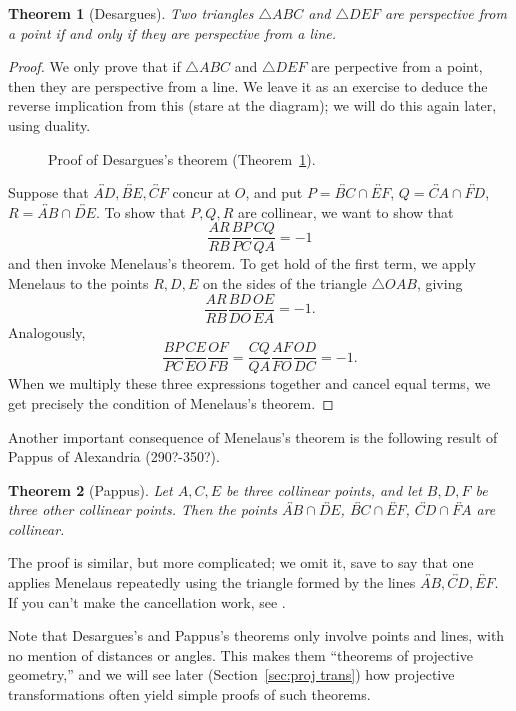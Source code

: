 \documentclass[12pt]{book}
\numberwithin{exc}{section}
\numberwithin{figure}{section}
\newtheorem{theorem}{Theorem}[section]
\numberwithin{equation}{theorem}
\def\line#1{\overleftrightarrow{#1}}
\begin{document}
\begin{theorem}[Desargues] \label{thm:desargues}
Two triangles $\triangle ABC$ 
and $\triangle DEF$ are perspective from a point if and only 
if they are perspective from a line.
\end{theorem}
\begin{proof}
We only prove that if $\triangle ABC$ and $\triangle DEF$ are 
perpective from a point, 
then they are perspective from a line. We leave it as an exercise to 
deduce the reverse implication from this (stare at the diagram); we 
will do this again later, using duality.
\begin{figure}[ht]
\caption{Proof of Desargues's theorem (Theorem~\ref{thm:desargues}).}
\end{figure}

Suppose that $\line{AD}, \line{BE}, \line{CF}$ concur at $O$, and put
$P = \line{BC} \cap \line{EF}$, 
$Q = \line{CA} \cap \line{FD}$, $R = \line{AB} \cap \line{DE}$. 
To show that $P, Q, R$ are 
collinear, we want to show that
\[
\frac{AR}{RB} \frac{BP}{PC} \frac{CQ}{QA} = -1
\]
and then invoke Menelaus's theorem. To get hold of the first term, we 
apply Menelaus to the points $R, D, E$ on the sides of the triangle 
$\triangle OAB$, giving
\[
\frac{AR}{RB} \frac{BD}{DO} \frac{OE}{EA} = -1.
\]
Analogously,
\[
\frac{BP}{PC} \frac{CE}{EO} \frac{OF}{FB} =
\frac{CQ}{QA} \frac{AF}{FO} \frac{OD}{DC} = -1.
\]
When we multiply these three expressions together and cancel equal terms, 
we get precisely the condition of Menelaus's theorem.
\end{proof}

Another important consequence of Menelaus's theorem is the following result 
of Pappus of Alexandria (290?-350?). 
 
\begin{theorem}[Pappus] \label{thm:pappus}
Let $A,C,E$ be three collinear points, and let $B,D,F$ be
three other collinear points. Then the points $\line{AB} \cap \line{DE}$, 
$\line{BC} \cap 
\line{EF}$, $\line{CD} \cap \line{FA}$ are collinear. 
\end{theorem}
The proof is similar, but more complicated; we omit it, save 
to say that one applies Menelaus repeatedly using the triangle formed 
by the lines $\line{AB}, \line{CD}, \line{EF}$. If
you can't make the cancellation work, see \cite{bib:cg}.

Note that Desargues's and Pappus's theorems only involve points 
and lines, with no mention of distances or angles. This makes them 
``theorems of projective geometry,'' and we will see later 
(Section~\ref{sec:proj trans}) how 
projective transformations often yield simple proofs of 
such theorems.
\end{document}
